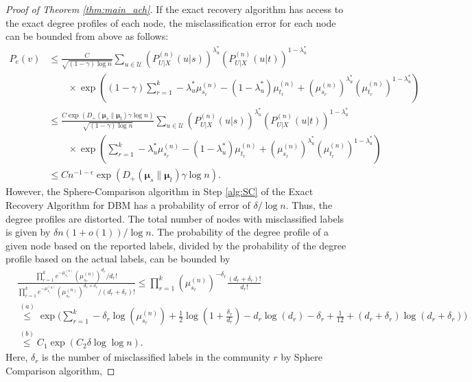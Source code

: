 \documentclass[11pt]{article}
\theoremstyle{plain}
\theoremstyle{definition}
\begin{document}
\begin{proof}[Proof of Theorem \ref{thm:main_ach}]
 If the exact recovery algorithm has access to the exact degree profiles of each node, the misclassification error for each node can be bounded from above as follows:
\begin{align*}
P_e(v) & \le \frac{C}{\sqrt{(1-\gamma)\log n}}  
  \sum_{u \in \mathcal{U}}
 (P^{(n)}_{U|X}(u|s))^{\lambda_u^*}  
 (P^{(n)}_{U|X}(u|t))^{1-\lambda_u^*}  \\
&\quad\quad \times \exp\left(  (1{-}\gamma) \sum_{r=1}^k 
 -\lambda_u^* \mu_{s_r}^{(n)} {-} 
(1{-}\lambda_u^*) \mu_{t_r}^{(n)} {+} (\mu_{s_r}^{(n)})^{\lambda_u^*} (\mu_{t_r}^{(n)})^{1-\lambda_u^*}
 \right) \\
 & \le
\frac{C  \exp(  D_+(\bm{\mu}_s \| \bm{\mu}_t )\gamma \log n) }{\sqrt{(1-\gamma)\log n}}
 \sum_{u \in \mathcal{U}}
 (P^{(n)}_{U|X}(u|s))^{\lambda_u^*}  
 (P^{(n)}_{U|X}(u|t))^{1-\lambda_u^*}  \\ 
 &\quad\quad\times \exp\left(  \sum_{r=1}^k 
 -\lambda_u^* \mu_{s_r}^{(n)} - 
(1-\lambda_u^*) \mu_{t_r}^{(n)} + (\mu_{s_r}^{(n)})^{\lambda_u^*} (\mu_{t_r}^{(n)})^{1-\lambda_u^*}
 \right) \\
 & \le
 C n^{-1-\epsilon }\exp( D_+(\bm{\mu}_s \| \bm{\mu}_t) \gamma \log n).
\end{align*} 
However, the {\sc Sphere-Comparison} algorithm in Step \ref{alg:SC} of the {\sc Exact Recovery Algorithm for DBM} has a probability of error of $\delta/\log n$.
Thus, the degree profiles are distorted.
The total number of nodes with misclassified labels is given by
$\delta n (1+o(1))/ \log n  $. The probability of the degree profile of a given node based on the reported labels, divided by the probability of the degree profile based on the actual labels, can be bounded  by
\begin{align*}
  &  \frac{
    \prod_{r=1}^k e^{-\mu_{s_r}^{(n)}} (\mu_{s_r}^{(n)})^{d_r}/d_r!
    }{
    \prod_{r=1}^k e^{-\mu_{s_r}^{(n)}} (\mu_{s_r}^{(n)})^{d_r+\delta_r}/(d_r+\delta_r)!
    }
    \le
    \prod_{r=1}^k (\mu_{s_r}^{(n)})^{-\delta_r}
    \frac{
      (d_r+\delta_r)!
    }{
     d_r!
    }    \\
  &  \overset{(a)}{\le}
    \exp\Big(
    \sum_{r=1}^k -\delta_r \log(\mu_{s_r}^{(n)}) {+} \frac{1}{2}\log(1+\frac{\delta_r}{d_r}) {-} d_r \log(d_r) {-} \delta_r {+} \frac{1}{12}  {+} (d_r+\delta_r)\log(d_r+\delta_r)\Big) \\
    & \overset{(b)}{\le}
    C_1 \exp(C_2 \delta \log\log n).
\end{align*}
Here, $\delta_r$ is the number of misclassified labels in the community $r$ 
by {\sc Sphere Comparison} algorithm,

\end{proof}
\end{document}
